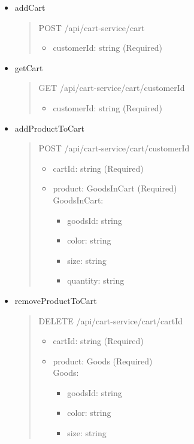 \begin{itemize}
	\item addCart
	      \begin{quote}
		      POST /api/cart-service/cart
		      \begin{itemize}
			      \item customerId: string (Required)
		      \end{itemize}
	      \end{quote}

	\item getCart
	      \begin{quote}
		      GET /api/cart-service/cart/{customerId}
		      \begin{itemize}
			      \item customerId: string (Required)
		      \end{itemize}
	      \end{quote}

	\item addProductToCart
	      \begin{quote}
		      POST /api/cart-service/cart/{customerId}
		      \begin{itemize}
			      \item cartId: string (Required)
			      \item product: GoodsInCart (Required)\\
							GoodsInCart:
							\begin{itemize}
								\item goodsId: string 
								\item color: string 
								\item size: string 
								\item quantity: string 
							\end{itemize}
		      \end{itemize}
	      \end{quote}

	\item removeProductToCart
	      \begin{quote}
		      DELETE /api/cart-service/cart/{cartId}
		      \begin{itemize}
			      \item cartId: string (Required)
			      \item product: Goods (Required)\\
							Goods:
							\begin{itemize}
								\item goodsId: string 
								\item color: string 
								\item size: string
							\end{itemize}
		      \end{itemize}
	      \end{quote}


\end{itemize}
